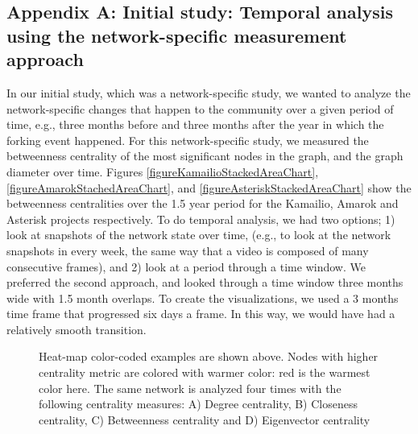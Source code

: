 \documentclass[11pt]{report}
\begin{document}
\begin{appendices}

\section{Appendix A: Initial study: Temporal analysis using the network-specific measurement approach}
\label{sectionInitialStudy}
In our initial study\cite{AzarbakhtOpenSym2013}\cite{AzarbakhtOSS2013}\cite{AzarbakhtVLHCC2014}, which was a network-specific study, we wanted to analyze the network-specific changes that happen to the community over a given period of time, e.g., three months before and three months after the year in which the forking event happened. For this network-specific study, we measured the betweenness centrality \cite{Brandes} of the most significant nodes in the graph, and the graph diameter over time. Figures \ref{figureKamailioStackedAreaChart}, \ref{figureAmarokStachedAreaChart}, and \ref{figureAsteriskStackedAreaChart} show the betweenness centralities over the 1.5 year period for the Kamailio, Amarok and Asterisk projects respectively. To do temporal analysis, we had two options; 1) look at snapshots of the network state over time, (e.g., to look at the network snapshots in every week, the same way that a video is composed of many consecutive frames), and 2) look at a period through a time window. We preferred the second approach, and looked through a time window three months wide with 1.5 month overlaps. To create the visualizations, we used a 3 months time frame that progressed six days a frame. In this way, we would have had a relatively smooth transition.

\begin{figure}[!ht]
\centering
{}
\caption[Heat-map color-coded examples Degree, Closeness, Betweenness, Eigenvector centralities]{Heat-map color-coded examples are shown above. Nodes with higher centrality metric are colored with warmer color: red is the warmest color here. The same network is analyzed four times with the following centrality measures:  A) Degree centrality, B) Closeness centrality, C) Betweenness centrality and D) Eigenvector centrality \cite{Rocchini}}
\label{figureCentrality}
\end{figure}


\end{appendices}
\end{document}

